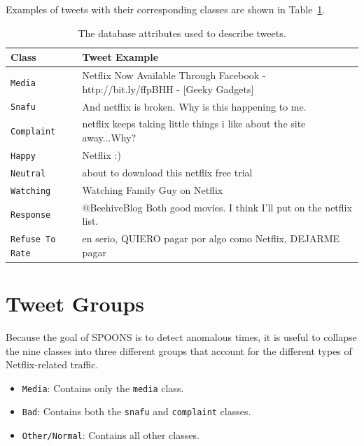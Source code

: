 \documentclass[12pt]{ucthesis}
\begin{document}
Examples of tweets with their corresponding classes are shown in Table~\ref{table:classes}.

\begin{table}
   \begin{center}
      \begin{tabular}{|l|p{12cm}|}
         \hline
            Class & Tweet Example
         \tabularnewline\hline
            \texttt{Media} & Netflix Now Available Through Facebook - http://bit.ly/ffpBHH - [Geeky Gadgets]
         \tabularnewline\hline
            \texttt{Snafu} & And netflix is broken. Why is this happening to me.
         \tabularnewline\hline
            \texttt{Complaint} & netflix keeps taking little things i like about the site away...Why?
         \tabularnewline\hline
            \texttt{Happy} & Netflix :)
         \tabularnewline\hline
            \texttt{Neutral} & about to download this netflix free trial
         \tabularnewline\hline
            \texttt{Watching} & Watching Family Guy on Netflix
         \tabularnewline\hline
            \texttt{Response} & @BeehiveBlog  Both good movies.  I think I'll put on the netflix list.
         \tabularnewline\hline
            \texttt{Refuse To Rate} & en serio, QUIERO pagar por algo como Netflix, DEJARME pagar
         \tabularnewline\hline
      \end{tabular}
   \end{center}
   \caption[Database Tweet Attributes]{The database attributes used to describe tweets.}
   \label{table:classes}
\end{table}

\section{Tweet Groups}
\label{class-tweet-groups}
Because the goal of SPOONS is to detect anomalous times, it is useful to collapse the nine classes into
three different groups that account for the different types of Netflix-related traffic.

\begin{itemize}
  \item \texttt{Media}: Contains only the \texttt{media} class.
  \item \texttt{Bad}: Contains both the \texttt{snafu} and \texttt{complaint} classes.
  \item \texttt{Other/Normal}: Contains all other classes.
\end{itemize}

\end{document}
